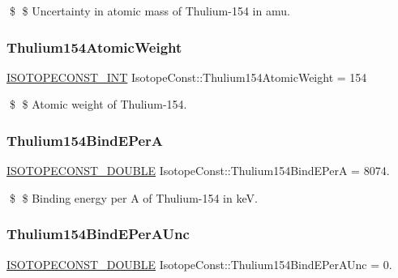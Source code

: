 \$ \$ Uncertainty in atomic mass of Thulium-\/154 in amu. \mbox{\label{group___isotope_const-_thulium-_tm154_ga20a1c061a75c2290b81fb23532bf1ae0}} 
\subsubsection{\texorpdfstring{Thulium154\+Atomic\+Weight}{Thulium154AtomicWeight}}
{\footnotesize\ttfamily \mbox{\hyperlink{group___isotope_const-_macros_ga5f18360b3e99483a35c32d789e62621c}{I\+S\+O\+T\+O\+P\+E\+C\+O\+N\+S\+T\+\_\+\+I\+NT}} Isotope\+Const\+::\+Thulium154\+Atomic\+Weight = 154}

\$ \$ Atomic weight of Thulium-\/154. \mbox{\label{group___isotope_const-_thulium-_tm154_gac52275e07f35d795e9d2a74e10532f4b}} 
\subsubsection{\texorpdfstring{Thulium154\+Bind\+E\+PerA}{Thulium154BindEPerA}}
{\footnotesize\ttfamily \mbox{\hyperlink{group___isotope_const-_macros_ga8f45a7272ce02c0b4c65c44636ed719a}{I\+S\+O\+T\+O\+P\+E\+C\+O\+N\+S\+T\+\_\+\+D\+O\+U\+B\+LE}} Isotope\+Const\+::\+Thulium154\+Bind\+E\+PerA = 8074.}

\$ \$ Binding energy per A of Thulium-\/154 in keV. \mbox{\label{group___isotope_const-_thulium-_tm154_ga1de036b9d99be241348a8b7fd913c200}} 
\subsubsection{\texorpdfstring{Thulium154\+Bind\+E\+Per\+A\+Unc}{Thulium154BindEPerAUnc}}
{\footnotesize\ttfamily \mbox{\hyperlink{group___isotope_const-_macros_ga8f45a7272ce02c0b4c65c44636ed719a}{I\+S\+O\+T\+O\+P\+E\+C\+O\+N\+S\+T\+\_\+\+D\+O\+U\+B\+LE}} Isotope\+Const\+::\+Thulium154\+Bind\+E\+Per\+A\+Unc = 0.}


